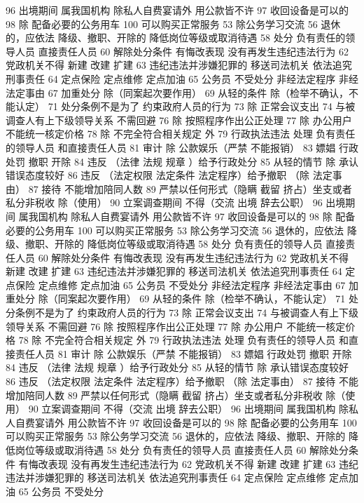 \documentclass[11pt]{ctexart}
\begin{document}
96 出境期间 属我国机构 除私人自费宴请外 用公款皆不许
97 收回设备是可以的
98 除 配备必要的公务用车
100 可以购买正常服务
53 除公务学习交流
56 退休的，应依法
降级、撤职、开除的 降低岗位等级或取消待遇
58 处分
负有责任的领导人员
直接责任人员
60 解除处分条件
有悔改表现
没有再发生违纪违法行为
62 党政机关不得
新建 改建 扩建
63 违纪违法并涉嫌犯罪的
移送司法机关
依法追究刑事责任
64 定点保险 定点维修 定点加油
65 公务员 不受处分
非经法定程序
非经法定事由
67 加重处分
除（同案起次要作用）
69 从轻的条件
除（检举不确认，不能认定）
71 处分条例不是为了
约束政府人员的行为
73 除 正常会议支出
74 与被调查人有上下级领导关系 不需回避
76 除 按照程序作出公正处理
77 除 办公用户
不能统一核定价格
78 除 不完全符合相关规定 外
79 行政执法违法 处理
负有责任的领导人员
和直接责任人员
81 审计
除 公款娱乐（严禁 不能报销）
83 嫖娼 行政处罚
撤职 开除
84 违反 （法律 法规 规章 ）给予行政处分
85 从轻的情节
除 承认错误态度较好
86 违反 （法定权限 法定条件 法定程序）给予撤职
（除 法定事由）
87 接待 不能增加陪同人数
89 严禁以任何形式（隐瞒 截留 挤占）坐支或者私分非税收
除（使用）
90 立案调查期间 不得（交流 出境 辞去公职）
96 出境期间 属我国机构 除私人自费宴请外 用公款皆不许
97 收回设备是可以的
98 除 配备必要的公务用车
100 可以购买正常服务
53 除公务学习交流
56 退休的，应依法
降级、撤职、开除的 降低岗位等级或取消待遇
58 处分
负有责任的领导人员
直接责任人员
60 解除处分条件
有悔改表现
没有再发生违纪违法行为
62 党政机关不得
新建 改建 扩建
63 违纪违法并涉嫌犯罪的
移送司法机关
依法追究刑事责任
64 定点保险 定点维修 定点加油
65 公务员 不受处分
非经法定程序
非经法定事由
67 加重处分
除（同案起次要作用）
69 从轻的条件
除（检举不确认，不能认定）
71 处分条例不是为了
约束政府人员的行为
73 除 正常会议支出
74 与被调查人有上下级领导关系 不需回避
76 除 按照程序作出公正处理
77 除 办公用户
不能统一核定价格
78 除 不完全符合相关规定 外
79 行政执法违法 处理
负有责任的领导人员
和直接责任人员
81 审计
除 公款娱乐（严禁 不能报销）
83 嫖娼 行政处罚
撤职 开除
84 违反 （法律 法规 规章 ）给予行政处分
85 从轻的情节
除 承认错误态度较好
86 违反 （法定权限 法定条件 法定程序）给予撤职
（除 法定事由）
87 接待 不能增加陪同人数
89 严禁以任何形式（隐瞒 截留 挤占）坐支或者私分非税收
除（使用）
90 立案调查期间 不得（交流 出境 辞去公职）
96 出境期间 属我国机构 除私人自费宴请外 用公款皆不许
97 收回设备是可以的
98 除 配备必要的公务用车
100 可以购买正常服务
53 除公务学习交流
56 退休的，应依法
降级、撤职、开除的 降低岗位等级或取消待遇
58 处分
负有责任的领导人员
直接责任人员
60 解除处分条件
有悔改表现
没有再发生违纪违法行为
62 党政机关不得
新建 改建 扩建
63 违纪违法并涉嫌犯罪的
移送司法机关
依法追究刑事责任
64 定点保险 定点维修 定点加油
65 公务员 不受处分
\end{document}
